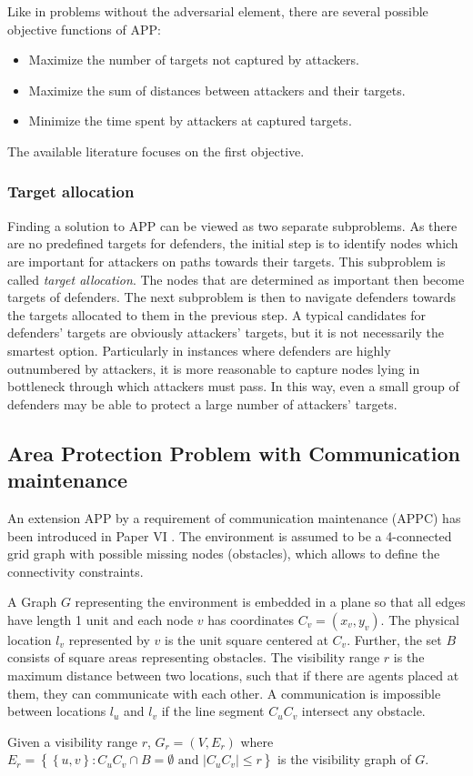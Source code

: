 Like in problems without the adversarial element, there are several possible objective functions of APP:
\begin{itemize}
        \item Maximize the number of targets not captured by attackers.
        \item Maximize the sum of distances between attackers and their targets.
        \item Minimize the time spent by attackers at captured targets.
\end{itemize}
The available literature focuses on the first objective.

\subsubsection{Target allocation}\label{sec:appta}

Finding a solution to APP can be viewed as two separate subproblems.
As there are no predefined targets for defenders, the initial step is to identify nodes which are important  for attackers on paths towards their targets.
This subproblem is called \emph{target allocation}.
The nodes that are determined as important then become targets of defenders.
The next subproblem is then to navigate defenders towards the targets allocated to them in the previous step.
A typical candidates for defenders' targets are obviously attackers' targets, but it is not necessarily the smartest option.
Particularly in instances where defenders are highly outnumbered by attackers, it is more reasonable to capture nodes lying in bottleneck through which attackers must pass.
In this way, even a small group of defenders may be able to protect a large number of attackers' targets.

\subsection{Area Protection Problem with Communication maintenance}

An extension APP by a requirement of communication maintenance (APPC) has been introduced in Paper VI \cite{ivanova18b}.
The environment is assumed to be a 4-connected grid graph with possible missing nodes (obstacles), which allows to define the connectivity constraints.

A Graph $G$ representing the environment is embedded in a plane so that all edges have length 1 unit and each node $v$ has coordinates $C_v=(x_v,y_v)$.
The physical location $l_v$ represented by $v$ is the unit square centered at $C_v$.
Further, the set $B$ consists of square areas representing obstacles.
The visibility range $r$ is the maximum distance between two locations, such that if there are agents placed at them, they can communicate with each other.
A communication is impossible between locations $l_u$ and $l_v$ if the line segment $C_uC_v$ intersect any obstacle. 
\begin{definition}
	Given a visibility range $r$, $G_r=(V,E_r)$ where \newline
	$E_r=\left\{\left\{u,v\right\}:C_uC_v\cap B=\emptyset\text{ and } |C_uC_v|\leq r\right\}$ is the visibility graph of $G$.
\end{definition}

